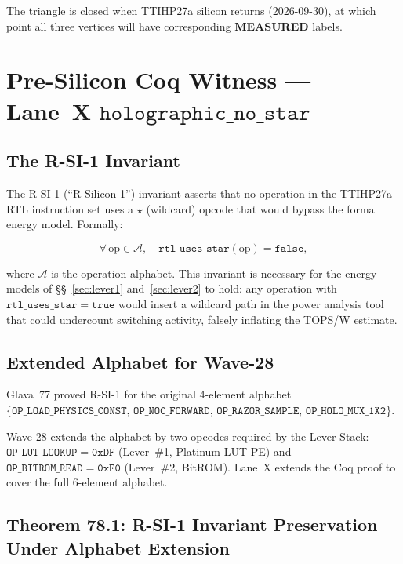 The triangle is closed when TTIHP27a silicon returns (2026-09-30), at which
point all three vertices will have corresponding \textbf{MEASURED} labels.

\section{Pre-Silicon Coq Witness --- Lane~X
  \texorpdfstring{$\mathtt{holographic\_no\_star}$}{holographic\_no\_star}}
\label{sec:coq_witness}

\subsection{The R-SI-1 Invariant}

The R-SI-1 (``R-Silicon-1'') invariant asserts that no operation in the
TTIHP27a RTL instruction set uses a \(\star\) (wildcard) opcode that would
bypass the formal energy model.  Formally:

\[
  \forall\, \mathrm{op} \in \mathcal{A},\quad
  \mathtt{rtl\_uses\_star}(\mathrm{op}) = \mathtt{false},
\]

where \(\mathcal{A}\) is the operation alphabet.  This invariant is necessary
for the energy models of §§~\ref{sec:lever1} and~\ref{sec:lever2} to hold:
any operation with \(\mathtt{rtl\_uses\_star} = \mathtt{true}\) would insert
a wildcard path in the power analysis tool that could undercount switching
activity, falsely inflating the TOPS/W estimate.

\subsection{Extended Alphabet for Wave-28}

Glava~77 proved R-SI-1 for the original 4-element alphabet
\(\{\mathtt{OP\_LOAD\_PHYSICS\_CONST},\, \mathtt{OP\_NOC\_FORWARD},\,
\mathtt{OP\_RAZOR\_SAMPLE},\, \mathtt{OP\_HOLO\_MUX\_1X2}\}\).

Wave-28 extends the alphabet by two opcodes required by the Lever Stack:
\(\mathtt{OP\_LUT\_LOOKUP} = \mathtt{0xDF}\) (Lever~\#1, Platinum LUT-PE) and
\(\mathtt{OP\_BITROM\_READ} = \mathtt{0xE0}\) (Lever~\#2, BitROM).
Lane~X extends the Coq proof to cover the full 6-element alphabet.

\subsection{Theorem 78.1: R-SI-1 Invariant Preservation Under Alphabet Extension}
\label{sec:theorem_78_1}

